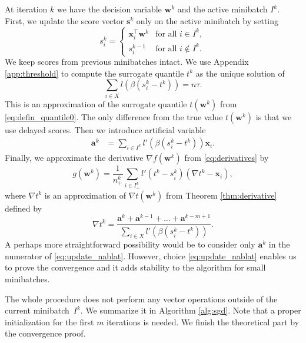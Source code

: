 At iteration $k$ we have the decision variable $\bm{w}^k$ and the active minibatch $I^k$. First, we update the score vector $\bm{s}^k$ only on the active minibatch by setting
\begin{equation}\label{eq:defin_z}
  s_i^k = \begin{cases} \bm{x}_i^\top \bm{w}^k &\text{for all }i\in I^k,\\ s_i^{k-1} &\text{for all }i\notin I^k.\end{cases} 
\end{equation}
We keep scores from previous minibatches intact. We use Appendix \ref{app:threshold} to compute the surrogate quantile $t^k$ as the unique solution of
\begin{equation}\label{eq:update_t}
  \sum_{i \in X}l(\beta(s_i^k - t^k)) = n\tau.
\end{equation}
This is an approximation of the surrogate quantile $t(\bm{w}^k)$ from \eqref{eq:defin_quantile0}. The only difference from the true value $t(\bm{w}^k)$ is that we use delayed scores. Then we introduce artificial variable
\begin{equation}\label{eq:update_a}
  \begin{aligned}
    \bm{a}^k &= \sum_{i\in I^k}l'(\beta(s_i^k - t^k))\bm{x}_i.
  \end{aligned}
\end{equation}
Finally, we approximate the derivative $\nabla f(\bm{w}^k)$ from \eqref{eq:derivatives} by
\begin{equation}\label{eq:update_g}
  g(\bm{w}^k) = \frac{1}{n^k_+}\sum_{i\in I^k_+}l'(t^k - s_i^k)(\nabla t^k - \bm{x}_i),
\end{equation}
where $\nabla t^k$ is an approximation of $\nabla t(\bm{w}^k)$ from Theorem \ref{thm:derivative} defined by
\begin{equation}\label{eq:update_nablat}
  \nabla t^k = \frac{\bm{a}^k + \bm{a}^{k-1} + \dots + \bm{a}^{k - m + 1}}{\sum_{i \in X} l'(\beta(s_i^k - t^k))}.
\end{equation}
A perhaps more straightforward possibility would be to consider only $\bm{a}^k$ in the numerator of \eqref{eq:update_nablat}. However, choice \eqref{eq:update_nablat} enables us to prove the convergence and it adds stability to the algorithm for small minibatches.

The whole procedure does not perform any vector operations outside of the current minibatch~$I^k$. We summarize it in Algorithm \ref{alg:sgd}. Note that a proper initialization for the first $m$ iterations is needed. We finish the theoretical part by the convergence proof.

